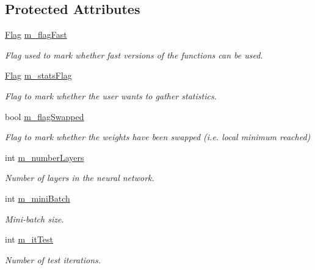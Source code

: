\subsection*{Protected Attributes}
\begin{DoxyCompactItemize}
\item 
\hyperlink{classNeuralNetwork_a4c1c6e488b842002a6d327726ff92dc5}{Flag} \hyperlink{classNeuralNetwork_af7766960680b9a413ee4b36acad1e83d}{m\+\_\+flag\+Fast}
\begin{DoxyCompactList}\small\item\em Flag used to mark whether fast versions of the functions can be used. \end{DoxyCompactList}\item 
\hyperlink{classNeuralNetwork_a4c1c6e488b842002a6d327726ff92dc5}{Flag} \hyperlink{classNeuralNetwork_accd035b1b93fd424025aeb4b40a31394}{m\+\_\+stats\+Flag}
\begin{DoxyCompactList}\small\item\em Flag to mark whether the user wants to gather statistics. \end{DoxyCompactList}\item 
bool \hyperlink{classNeuralNetwork_a5009762781007f09860915f307701a60}{m\+\_\+flag\+Swapped}
\begin{DoxyCompactList}\small\item\em Flag to mark whether the weights have been swapped (i.\+e. local minimum reached) \end{DoxyCompactList}\item 
int \hyperlink{classNeuralNetwork_a1efaefc2c42a3d309c0b5e4a80a55f52}{m\+\_\+number\+Layers}
\begin{DoxyCompactList}\small\item\em Number of layers in the neural network. \end{DoxyCompactList}\item 
int \hyperlink{classNeuralNetwork_ad29fd15c4f0fc4c8fd214b4e815093b9}{m\+\_\+mini\+Batch}
\begin{DoxyCompactList}\small\item\em Mini-\/batch size. \end{DoxyCompactList}\item 
int \hyperlink{classNeuralNetwork_ae4f1fb12e7f5df8dac69abda6fe4d141}{m\+\_\+it\+Test}
\begin{DoxyCompactList}\small\item\em Number of test iterations. \end{DoxyCompactList}\item 

\end{DoxyCompactItemize}
